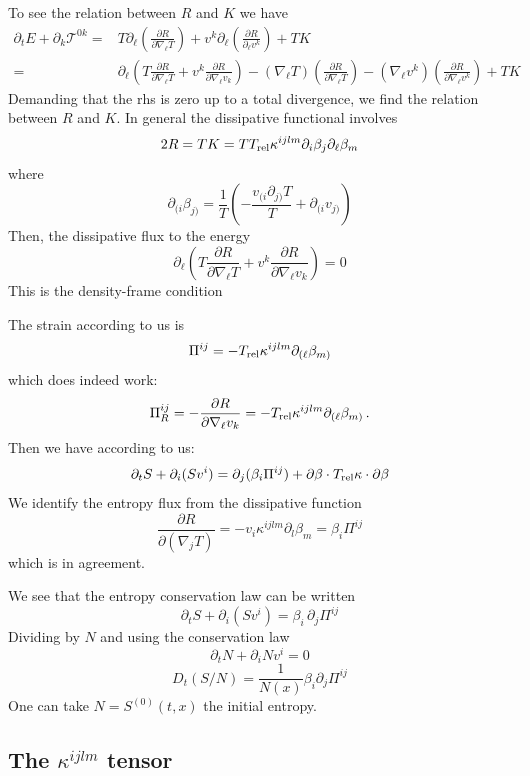 \documentclass[12pt,aps,preprint,nofootinbib,noshowkeys,noshowpacs,longbibliography,superscriptaddress,tightenlines]{revtex4-2}
\def\st{\begin{equation}}
\def\stp{\end{equation}}
\def\tideal{{\mathcal T}}
\begin{document}
To see the relation between $R$ and $K$ we have
\begin{align}
    \partial_t E  + \partial_k \tideal^{0k} =& T 
    \partial_\ell \left(\frac{\partial R }{ \partial \nabla_\ell T  }   \right)  
+    v^k \partial_\ell \left(\frac{\partial R }{ \partial_\ell v^k  } \right) + T K \\
    =&  \partial_{\ell} \left( T \frac{\partial R }{ \partial \nabla_\ell T  }  + v^k  \frac{\partial R}{\partial \nabla_\ell v_k }
	\right)   
	-
      (\nabla_\ell T) \left(\frac{\partial R }{ \partial \nabla_\ell T  }   \right)  
      - (\nabla_\ell v^k )  \left(\frac{\partial R }{ \partial \nabla_\ell v^k  } \right) + T K
\end{align}
Demanding that the rhs is zero up to a total divergence, we find
the relation between $R$ and $K$.
In general the dissipative functional involves
\st
2 R  = T K = T T_{\rm rel} \kappa^{ijlm} \partial_{i}\beta_j  \partial_{\ell} \beta_m
\stp
where
\st
\partial_{(i} \beta_{j)} = \frac{1}{T} \left( -\frac{v_{(i}\partial_{j)}T }{T} + \partial_{(i} v_{j)} \right)  
\stp
Then,   the dissipative flux to the energy
\st
\partial_{\ell} \left( T \frac{\partial R }{ \partial \nabla_\ell T  }  + v^k  \frac{\partial R}{\partial \nabla_\ell v_k }
\right) = 0 
\stp
This is the density-frame condition


The  strain according to us  is 
\st
\Pi^{ij} = -T_{\rm rel} \kappa^{ijlm} \partial_{(\ell} \beta_{m)} 
\stp
which does indeed work:
\st
\Pi^{ij}_R = -\frac{ \partial R}{\partial \nabla_\ell  v_k }  = - T_{\rm rel} \kappa^{ijlm} \partial_{(\ell} \beta_{m)} \, .
\stp
Then we have according to us:
\st
\partial_t S + \partial_i (S v^i) = \partial_j (\beta_i \Pi^{ij})   +   \partial\beta \cdot T_{\rm rel} \kappa \cdot \partial\beta 
\stp
We identify the entropy flux from the dissipative function
\st
\frac{\partial R}{\partial( \nabla_j T) } = -v_i \kappa^{ijlm} \partial_l\beta_m = \beta_i \Pi^{ij}
\stp
which is in agreement. 

We see that the entropy conservation law can be written
\st
\partial_t S + \partial_i (S v^i)= \beta_{i} \,  \partial_{j} \Pi^{ij} 
\stp
Dividing by $N$ and using the conservation law
\st
 \partial_t N + \partial_i N v^i  = 0
\stp
\st
D_t (S/N)  = \frac{1}{N(x)} \beta_i \partial_j \Pi^{ij}
\stp
One can take $N=S^{(0)}(t, x)$ the initial entropy.

\subsection{\texorpdfstring{The $\kappa^{ijlm}$ tensor}{The kappa\^{}\{ijlm\} tensor}}
\label{sec:kappa}
\end{document}
